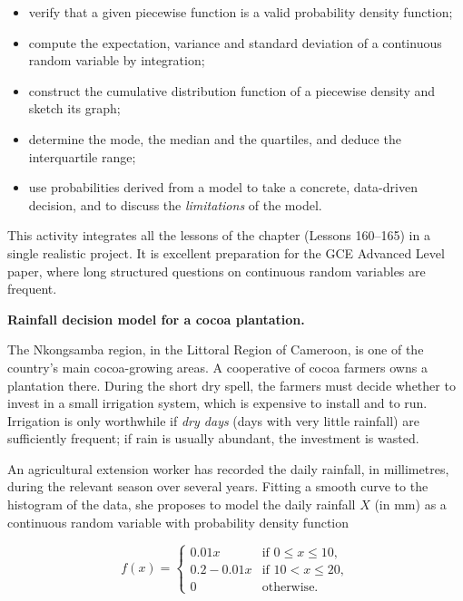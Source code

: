 \documentclass[11pt]{article}
\newcommand{\cle}[1]{{\popxbold\color{popdark}#1}}
\newcounter{popsec}
\newcounter{popsub}
\newcommand{\courssub}[1]{%
  \stepcounter{popsub}%
  \par\vspace{9pt}\noindent{\popxbold\fontsize{11.5}{13}\selectfont\color{popink}{\color{poporange}\thepopsec.\thepopsub}\hspace{6pt}#1}\par\nopagebreak\vspace{4pt}
}
\begin{document}
\begin{itemize}
\item verify that a given piecewise function is a valid \cle{probability density function};
\item compute the \cle{expectation}, \cle{variance} and \cle{standard deviation} of a continuous random variable by integration;
\item construct the \cle{cumulative distribution function} of a piecewise density and sketch its graph;
\item determine the \cle{mode}, the \cle{median} and the \cle{quartiles}, and deduce the \cle{interquartile range};
\item use probabilities derived from a model to take a concrete, data-driven decision, and to discuss the \emph{limitations} of the model.
\end{itemize}

This activity integrates all the lessons of the chapter (Lessons 160--165) in a single realistic project. It is excellent preparation for the GCE Advanced Level paper, where long structured questions on continuous random variables are frequent.

\courssub{Situation}

\textbf{Rainfall decision model for a cocoa plantation.}\par

The Nkongsamba region, in the Littoral Region of Cameroon, is one of the country's main cocoa-growing areas. A cooperative of cocoa farmers owns a plantation there. During the short dry spell, the farmers must decide whether to invest in a small irrigation system, which is expensive to install and to run. Irrigation is only worthwhile if \emph{dry days} (days with very little rainfall) are sufficiently frequent; if rain is usually abundant, the investment is wasted.

An agricultural extension worker has recorded the daily rainfall, in millimetres, during the relevant season over several years. Fitting a smooth curve to the histogram of the data, she proposes to model the daily rainfall $X$ (in mm) as a continuous random variable with probability density function

\[
f(x)=\begin{cases}
0.01x & \text{if } 0\leq x\leq 10,\\[2pt]
0.2-0.01x & \text{if } 10<x\leq 20,\\[2pt]
0 & \text{otherwise.}
\end{cases}
\]
\end{document}

